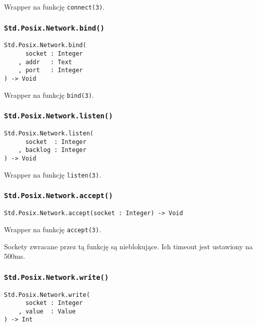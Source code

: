 Wrapper na funkcję \texttt{connect(3)}.

\subsubsection{\texttt{Std.Posix.Network.bind()}}

\begin{small}
\begin{lstlisting}
Std.Posix.Network.bind(
      socket : Integer
    , addr   : Text
    , port   : Integer
) -> Void
\end{lstlisting}
\end{small}

Wrapper na funkcję \texttt{bind(3)}.

\subsubsection{\texttt{Std.Posix.Network.listen()}}

\begin{small}
\begin{lstlisting}
Std.Posix.Network.listen(
      socket  : Integer
    , backlog : Integer
) -> Void
\end{lstlisting}
\end{small}

Wrapper na funkcję \texttt{listen(3)}.

\subsubsection{\texttt{Std.Posix.Network.accept()}}

\begin{small}
\begin{lstlisting}
Std.Posix.Network.accept(socket : Integer) -> Void
\end{lstlisting}
\end{small}

Wrapper na funkcję \texttt{accept(3)}.

Sockety zwracane przez tą funkcję są nieblokujące. Ich timeout jest ustawiony na 500ms.

\subsubsection{\texttt{Std.Posix.Network.write()}}

\begin{small}
\begin{lstlisting}
Std.Posix.Network.write(
      socket : Integer
    , value  : Value
) -> Int
\end{lstlisting}
\end{small}

